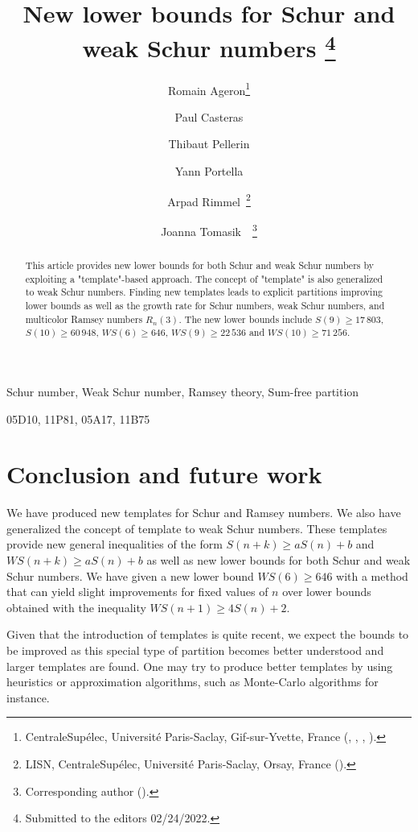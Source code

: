 \documentclass[final,onefignum,onetabnum]{siamart190516}
\title{New lower bounds for Schur and weak Schur numbers \thanks{Submitted to the editors 02/24/2022.}}
\author{Romain Ageron\thanks{CentraleSup\'elec, Universit\'e{} Paris-Saclay, Gif-sur-Yvette, France
	(\email{romain.ageron@student-cs.fr}, \email{paul.casteras@student-cs.fr},
	\email{thibaut.pellerin@student-cs.fr}, \email{yann.portella@student-cs.fr}).}
\and Paul Casteras\footnotemark[2]
\and Thibaut Pellerin\footnotemark[2]
\and Yann Portella\footnotemark[2]
\and Arpad Rimmel\footnotemark[2]\ \thanks{LISN, CentraleSup\'elec, Universit\'e{} Paris-Saclay, Orsay, France
	(\email{arpad.rimmel@centralesupelec.fr}).}
\and Joanna Tomasik\footnotemark[2]\ \footnotemark[3]\ \thanks{Corresponding author
	(\email{joanna.tomasik@centralesupelec.fr}).}}
\newcommand{\WS}{\mathit{WS}}
\begin{document}
\maketitle

\begin{abstract}
This article provides new lower bounds for both Schur and weak Schur numbers by exploiting a "template"-based approach.
The concept of "template" is also generalized to weak Schur numbers. Finding new templates leads to explicit partitions
improving lower bounds as well as the growth rate for Schur numbers, weak Schur numbers, and multicolor Ramsey numbers \(R_n(3)\).
The new lower bounds include \(S(9) \geqslant 17\,803\), \(S(10) \geqslant 60\,948\), \(\WS(6) \geqslant 646\),
\(\WS (9) \geqslant 22\,536\) and \(\WS (10) \geqslant 71\,256 \).
\end{abstract}

\begin{keywords}
	Schur number, Weak Schur number, Ramsey theory, Sum-free partition
\end{keywords}

\begin{AMS}
	05D10, 11P81, 05A17, 11B75
\end{AMS}







\section{Conclusion and future work}

We have produced new templates for Schur and Ramsey numbers. We also have generalized the concept of template to weak Schur numbers.
These templates provide new general inequalities of the form \(S(n+k) \geqslant a S(n) + b\) and \(\WS(n+k) \geqslant a S(n) + b\)
as well as new lower bounds for both Schur and weak Schur numbers. We have given a new lower bound \(\WS(6) \geqslant 646\) with
a method that can yield slight improvements for fixed values of \(n\) over lower bounds obtained with the inequality
\(\WS(n+1) \geqslant 4 S(n) + 2\).

Given that the introduction of templates is quite recent, we expect the bounds to be improved as this special type of partition
becomes better understood and larger templates are found. One may try to produce better templates by using heuristics or
approximation algorithms, such as Monte-Carlo algorithms for instance.
\end{document}
